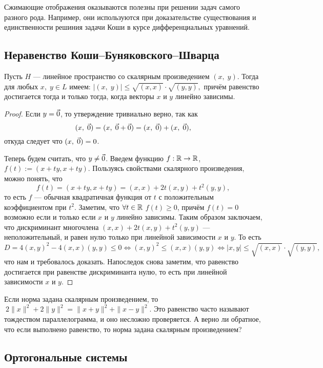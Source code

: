 Сжимающие отображения оказываются полезны при решении задач самого разного рода. Например, они используются при доказательстве существования и единственности решиния задачи Коши в курсе дифференциальных уравнений. 

\subsection{Неравенство Коши--Буняковского--Шварца}

\begin{Theorem}
	Пусть $H$ --- линейное пространство со скалярным произведением $(x,\;y)$.
	Тогда для любых $x,\;y\in L$ имеем: $|( x,\;y) | \leqslant  \sqrt{(x, x)}\cdot \sqrt{(y, y)},$ причём равенство достигается тогда и только тогда, когда векторы $x$ и $y$ линейно зависимы.
\end{Theorem}
\begin{proof}
	Если $y = \vec{0}$, то утверждение тривиально верно, так как $$ ( x,\;\vec{0}) = ( x,\;\vec{0}+\vec{0}) = ( x,\;\vec{0})+( x,\;\vec{0}),$$
	откуда следует что $( x,\;\vec{0}) = 0$.
	
	Теперь будем считать, что $y\neq \vec{0}$. Введем функцию $f: \mathbb{R} \rightarrow\mathbb{R}$, $f(t):=(x+ty, x+ty)$. Пользуясь свойствами скалярного произведения, можно понять, что 
    $$ f(t) =(x+ty, x+ty) = (x, x)+2t(x, y)+t^2(y, y),$$ 
    то есть $f$ --- обычная квадратичная функция от $t$ с положительным коэффициентом при $t^2$. Заметим, что $\forall t\in\mathbb{R}$ $f(t)\geq0$, причём $f(t)=0$ возможно если и только если $x$ и $y$ линейно зависимы. Таким образом заключаем, что дискриминант многочлена $(x, x)+2t(x, y)+t^2(y, y)$ --- неположительный, и равен нулю только при линейной зависимости $x$ и $y$. То есть 
	\[D = 4(x, y)^2-4(x, x)(y, y)\leq 0 \Leftrightarrow (x, y)^2\leq(x, x)(y, y) \Leftrightarrow |x, y|\leq \sqrt{(x, x)}\cdot \sqrt{(y, y)},\]
	что нам и требовалось доказать. Напоследок снова заметим, что равенство достигается при равенстве дискриминанта нулю, то есть при линейной зависимости $x$ и $y$.
\end{proof}
\begin{Task}
	Если норма задана скалярным произведением, то 
	$\ 2\|x\|^2+2\|y\|^2=\|x+y\|^2+\|x-y\|^2$. Это равенство часто называют тождеством параллелограмма, и оно несложно проверяется. А верно ли обратное, что если выполнено равенство, то норма задана скалярным произведением?
\end{Task}

\subsection{Ортогональные системы}



